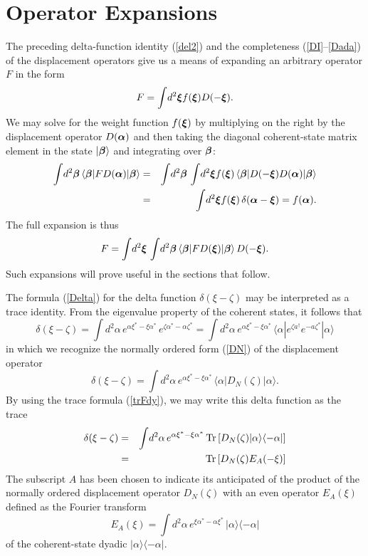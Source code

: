\documentclass[12pt]{article}
\def\beq{\begin{equation}}
\def\eeq{\end{equation}}
\def\bea{\begin{eqnarray}}
\def\eea{\end{eqnarray}}
\def\a{\alpha}
\def\ba{{\mbox{\boldmath$\alpha$}}}
\def\sa{\alpha^*}
\def\ad{a^\dgr}
\def\bb{{\mbox{\boldmath$\beta$}}}
\def\d{\delta}
\def\z{\zeta}
\def\zs{\zeta^*}
\def\x{\xi}
\def\bx{{\mbox{\boldmath$\xi$}}}
\def\xs{\xi^*}
\def\nn{\nonumber}
\def\dgr{\dagger}
\def\Tr{{\rm Tr}}
\def\co_st{coherent-state}
\def\op{operator }
\def\ops{operators }
\begin{document}
\section{Operator Expansions}
\par
The preceding delta-function identity (\ref {del2})
and the completeness (\ref {DI}--\ref {Dada})
of the displacement \ops give us a means of expanding 
an arbitrary operator $ F $ in the form
\beq
F = \int \! d^2\bx f ( \bx ) D( -\bx ) .
\label {exp1}
\eeq
We may solve for the weight function $ f ( \bx ) $
by multiplying on the right
by the displacement \op $ D( \ba ) $
and then taking the diagonal coherent-state matrix element
in the state $ | \bb \rangle $ and integrating over $ \bb $:
\bea
\int \! d^2\bb \, \langle \bb | F D( \ba ) | \bb \rangle & = &
\int \! d^2\bb \, \int \! d^2\bx f ( \bx ) \,
\langle \bb | D( -\bx ) D( \ba ) | \bb \rangle \nn\\
& = & \int \! d^2\bx f ( \bx ) \, \d( \ba - \bx ) 
= f ( \ba ) .
\label {delta_identity}
\eea
The full expansion is thus 
\beq
F = \int \! d^2\bx \, \int \! d^2\bb \, 
\langle \bb | F D( \bx ) | \bb \rangle \,
D( -\bx ) .
\label {delta_expansion}
\eeq
Such expansions will prove useful in the sections that follow.
\par
The formula (\ref {Delta}) for the delta
function $ \d ( \x - \z ) $ may be interpreted
as a trace identity.
From the eigenvalue property of the coherent states,
it follows that
\beq
\d ( \x - \z ) = \int \! d^2 \a \,
e ^ { \a \xs - \x \sa } \, e ^ { \z \sa - \a \zs }
= \int \! d^2 \a \,
e ^ { \a \xs - \x \sa } \, \langle \a | 
e ^ { \z \ad } e ^ { - a \zs } | \a \rangle
\label {deqee}
\eeq 
in which we recognize
the normally ordered form (\ref {DN}) of the displacement operator 
\beq
\d ( \x - \z ) = \int \! d^2 \a \,
e ^ { \a \xs - \x \sa } \, \langle \a | D_N( \z ) | \a \rangle .
\label {deqDN}
\eeq
By using the trace formula (\ref {trFdy}),
we may write this delta function as the trace 
\bea
\d ( \x - \z ) & = & \int \! d^2 \a \,
e ^ { \a \xs - \x \sa } \, 
\Tr \left[ D_N( \z ) | \a \rangle \langle - \a | \right] 
\nn\\
& = & \Tr \left[ D_N( \z ) E_A( - \x ) \right]
\label {deqtrDNEA}
\eea
The subscript $ A $ has been chosen to indicate its anticipated
of the product of the normally ordered displacement operator $ D_N( \z ) $
with an even operator $ E_A( \x ) $
defined as the Fourier transform
\beq
E_A( \x ) = \int \! d^2 \a \,
e ^ { \x \sa - \a \xs } \,
| \a \rangle \langle - \a | 
\label {EA}
\eeq
of the \co_st dyadic $ | \a \rangle \langle - \a |$.
\end{document}
